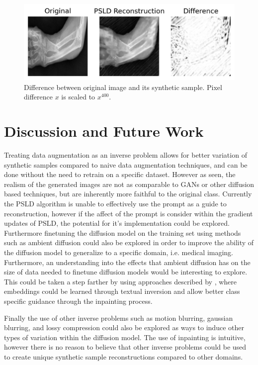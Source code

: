 \documentclass{article}
\begin{document}
\begin{figure}[ht]
    \vskip -0.1in
    \begin{center}
        \centerline{\includegraphics[width=\columnwidth]{difference.png}}
        \caption{Difference between original image and its synthetic sample. Pixel difference $x$ is scaled to $x^{400}$.}
        \label{difference}
    \end{center}
    \vskip -0.3in
\end{figure}

\section{Discussion and Future Work}

Treating data augmentation as an inverse problem allows for better variation of synthetic samples compared to naive data augmentation techniques, and can be done
without the need to retrain on a specific dataset. However as seen, the realism of the generated images are not as comparable to GANs or other diffusion based techniques,
but are inherently more faithful to the original class. Currently the PSLD algorithm is unable to effectively use the prompt as a guide to reconstruction, however if the 
affect of the prompt is consider within the gradient updates of PSLD, the potential for it's implementation could be explored. Furthermore finetuning the diffusion model on
the training set using methods such as ambient diffusion \cite{2305.19256} could also be explored in order to improve the ability of the diffusion model to generalize to 
a specific domain, i.e. medical imaging. Furthermore, an understanding into the effects that ambient diffusion has on the size of data needed to finetune diffusion models
would be interesting to explore. This could be taken a step farther by using approaches described by \cite{2302.07944}, where embeddings could be learned through
textual inversion and allow better class specific guidance through the inpainting process. 

Finally the use of other inverse problems such as motion blurring, gaussian blurring, and lossy compression could also be explored as ways to induce other types of variation
within the diffusion model. The use of inpainting is intuitive, however there is no reason to believe that other inverse problems could be used to create unique synthetic
sample reconstructions compared to other domains. 
\end{document}
